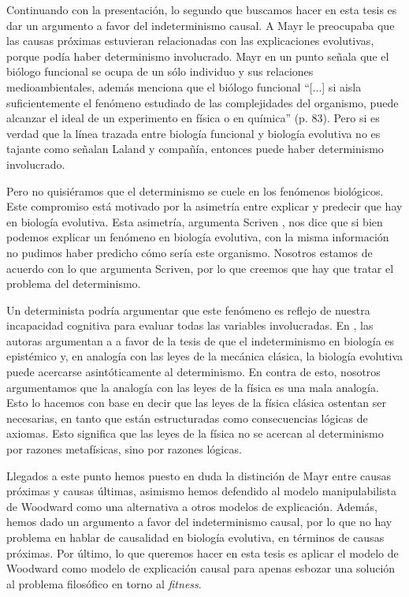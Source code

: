 Continuando con la presentación, lo segundo que buscamos hacer en esta tesis es dar un argumento a favor del indeterminismo causal. A Mayr le preocupaba que las causas próximas estuvieran relacionadas con las explicaciones evolutivas, porque podía haber determinismo involucrado. Mayr \cite{Mayr1998} en un punto señala que el biólogo funcional se ocupa de un sólo individuo y sus relaciones medioambientales, además menciona que el biólogo funcional ``[...] si aisla suficientemente el fenómeno estudiado de las complejidades del organismo, puede alcanzar el ideal de un experimento en física o en química'' (p. 83). Pero si es verdad que la línea trazada entre biología funcional y biología evolutiva no es tajante como señalan Laland y compañía, entonces puede haber determinismo involucrado.

Pero no quisiéramos que el determinismo se cuele en los fenómenos biológicos. Este compromiso está motivado por la asimetría entre explicar y predecir que hay en biología evolutiva. Esta asimetría, argumenta Scriven \citeyear{Scriven1959}, nos dice que si bien podemos explicar un fenómeno en biología evolutiva, con la misma información no pudimos haber predicho cómo sería este organismo. Nosotros estamos de acuerdo con lo que argumenta Scriven, por lo que creemos que hay que tratar el problema del determinismo.

Un determinista podría argumentar que este fenómeno es reflejo de nuestra incapacidad cognitiva para evaluar todas las variables involucradas. En \cite{Graves1999}, las autoras argumentan a a favor de la tesis de que el indeterminismo en biología es epistémico y, en analogía con las leyes de la mecánica clásica, la biología evolutiva puede acercarse asintóticamente al determinismo. En contra de esto, nosotros argumentamos que la analogía con las leyes de la física es una mala analogía. Esto lo hacemos con base en decir que las leyes de la física clásica ostentan ser necesarias, en tanto que están estructuradas como consecuencias lógicas de axiomas. Esto significa que las leyes de la física no se acercan al determinismo por razones metafísicas, sino por razones lógicas.

Llegados a este punto hemos puesto en duda la distinción de Mayr entre causas próximas y causas últimas, asimismo hemos defendido al modelo manipulabilista de Woodward como una alternativa a otros modelos de explicación. Además, hemos dado un argumento a favor del indeterminismo causal, por lo que no hay problema en hablar de causalidad en biología evolutiva, en términos de causas próximas. Por último, lo que queremos hacer en esta tesis es aplicar el modelo de Woodward como modelo de explicación causal para apenas esbozar una solución al problema filosófico en torno al \emph{fitness}.

